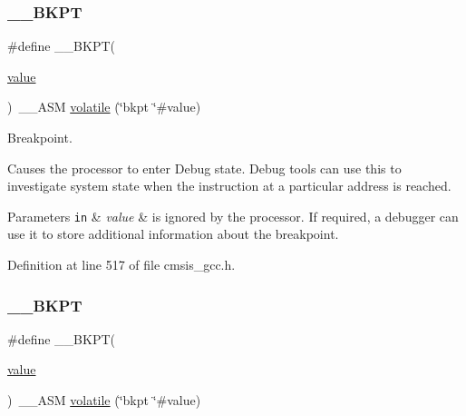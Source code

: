 \subsubsection{\texorpdfstring{\+\_\+\+\_\+\+B\+K\+PT}{\_\_BKPT}\hspace{0.1cm}{\footnotesize\ttfamily [2/3]}}
{\footnotesize\ttfamily \#define \+\_\+\+\_\+\+B\+K\+PT(\begin{DoxyParamCaption}\item[{}]{\hyperlink{semihosting_8h_aacce635d68067370c70caa2381ea1040}{value} }\end{DoxyParamCaption})~\+\_\+\+\_\+\+A\+SM \hyperlink{semihosting_8h_a65e6ad7ed1b130fda2cf7f6a0861fca9}{volatile} (\char`\"{}bkpt \char`\"{}\#value)}



Breakpoint. 

Causes the processor to enter Debug state. Debug tools can use this to investigate system state when the instruction at a particular address is reached. 
\begin{DoxyParams}[1]{Parameters}
\mbox{\tt in}  & {\em value} & is ignored by the processor. If required, a debugger can use it to store additional information about the breakpoint. \\
\hline
\end{DoxyParams}


Definition at line 517 of file cmsis\+\_\+gcc.\+h.

\mbox{\label{group___c_m_s_i_s___core___instruction_interface_ga15ea6bd3c507d3e81c3b3a1258e46397}} 
\subsubsection{\texorpdfstring{\+\_\+\+\_\+\+B\+K\+PT}{\_\_BKPT}\hspace{0.1cm}{\footnotesize\ttfamily [3/3]}}
{\footnotesize\ttfamily \#define \+\_\+\+\_\+\+B\+K\+PT(\begin{DoxyParamCaption}\item[{}]{\hyperlink{semihosting_8h_aacce635d68067370c70caa2381ea1040}{value} }\end{DoxyParamCaption})~\+\_\+\+\_\+\+A\+SM \hyperlink{semihosting_8h_a65e6ad7ed1b130fda2cf7f6a0861fca9}{volatile} (\char`\"{}bkpt \char`\"{}\#value)}



